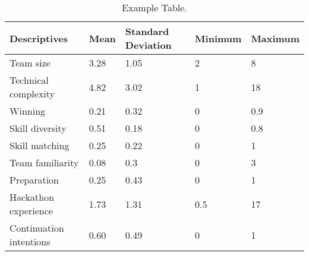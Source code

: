 \begin{table}[h]
\begin{center}

\begin{tabular}{L{2.5cm}L{2cm}L{2cm}L{2cm}L{2cm}}
\toprule 
Descriptives       & Mean & Standard Deviation & Minimum & Maximum \\ \hline
Team size               & 3.28      & 1.05   & 2              & 8             \\
Technical complexity & 4.82      & 3.02                & 1             & 18             \\
Winning      & 0.21     & 0.32                & 0             & 0.9            \\
Skill diversity         &  0.51     &  0.18               & 0              & 0.8            \\
Skill matching         & 0.25      & 0.22             & 0             & 1             \\
Team familiarity         & 0.08      & 0.3           & 0            & 3            \\
Preparation             & 0.25      & 0.43                & 0             & 1            \\
Hackathon experience      & 1.73     & 1.31           & 0.5             & 17            \\
Continuation intentions      & 0.60     & 0.49           & 0             & 1            \\ \bottomrule
\end{tabular}
\end{center}

\caption{Example Table.}
\label{tab:regr}
\end{table}